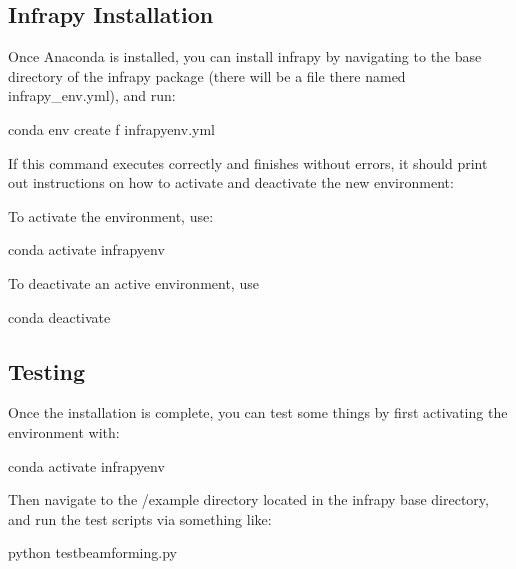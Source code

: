 \documentclass[letterpaper,10pt,english]{sphinxmanual}
\begin{document}
\subsection{Infrapy Installation}
\label{\detokenize{installation:infrapy-installation}}
Once Anaconda is installed, you can install infrapy by navigating to the base directory of the infrapy package (there will be a file there
named infrapy\_env.yml), and run:

\begin{sphinxVerbatim}[commandchars=\\\{\}]
\PYGZgt{}\PYGZgt{} conda env create \PYGZhy{}f infrapy\PYGZus{}env.yml
\end{sphinxVerbatim}

If this command executes correctly and finishes without errors, it should print out instructions on how to activate and deactivate the new environment:

To activate the environment, use:

\begin{sphinxVerbatim}[commandchars=\\\{\}]
\PYGZgt{}\PYGZgt{} conda activate infrapy\PYGZus{}env
\end{sphinxVerbatim}

To deactivate an active environment, use

\begin{sphinxVerbatim}[commandchars=\\\{\}]
\PYGZgt{}\PYGZgt{} conda deactivate
\end{sphinxVerbatim}


\subsection{Testing}
\label{\detokenize{installation:testing}}
Once the installation is complete, you can test some things by first activating the environment with:

\begin{sphinxVerbatim}[commandchars=\\\{\}]
\PYGZgt{}\PYGZgt{} conda activate infrapy\PYGZus{}env
\end{sphinxVerbatim}

Then navigate to the /example directory located in the infrapy base directory, and run the test scripts via something like:

\begin{sphinxVerbatim}[commandchars=\\\{\}]
\PYGZgt{}\PYGZgt{} python test\PYGZus{}beamforming.py
\end{sphinxVerbatim}
\end{document}

